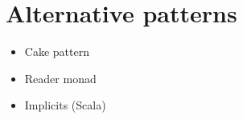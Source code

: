 \documentclass[10pt]{beamer}
\begin{document}
	\section{Alternative patterns}
	\begin{frame}[fragile]
		\begin{itemize}
			\item Cake pattern
			\item Reader monad 
			\item Implicits (Scala)
		\end{itemize}
	\end{frame}

% 
% 
\end{document}
